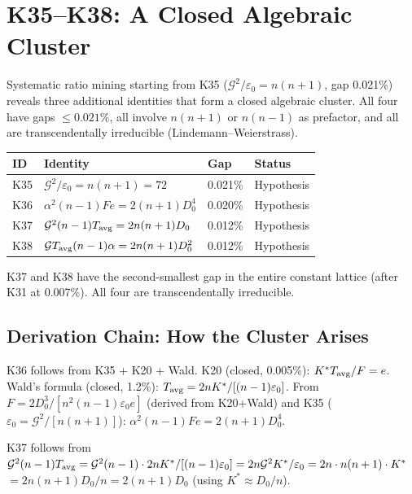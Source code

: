 \documentclass[12pt, a4paper]{article}
\begin{document}
\section{K35--K38: A Closed Algebraic Cluster}

Systematic ratio mining starting from K35 ($\mathcal{G}^2/\varepsilon_0 = n(n+1)$,
gap 0.021\%) reveals three additional identities that form a closed algebraic cluster.
All four have gaps $\leq 0.021\%$, all involve $n(n+1)$ or $n(n-1)$ as prefactor,
and all are transcendentally irreducible (Lindemann--Weierstrass).

\begin{keybox}[title={K35--K38: The Closed Cluster}]
\begin{center}
\renewcommand{\arraystretch}{1.3}
\begin{tabular}{p{0.7cm} p{6.5cm} p{1.5cm} p{2cm}}
\toprule
\textbf{ID} & \textbf{Identity} & \textbf{Gap} & \textbf{Status} \\
\midrule
K35 & $\mathcal{G}^2/\varepsilon_0 = n(n+1) = 72$ & 0.021\% & Hypothesis \\
K36 & $\alpha^2(n-1)Fe = 2(n+1)D_0^4$ & 0.020\% & Hypothesis \\
K37 & $\mathcal{G}^2(n-1)T_{\rm avg} = 2n(n+1)D_0$ & 0.012\% & Hypothesis \\
K38 & $\mathcal{G}T_{\rm avg}(n-1)\alpha = 2n(n+1)D_0^2$ & 0.012\% & Hypothesis \\
\bottomrule
\end{tabular}
\end{center}
K37 and K38 have the second-smallest gap in the entire constant lattice (after K31 at 0.007\%).
All four are transcendentally irreducible.
\end{keybox}

\subsection{Derivation Chain: How the Cluster Arises}

K36 follows from K35 + K20 + Wald. K20 (closed, 0.005\%): $K^*T_{\rm avg}/F = e$.
Wald's formula (closed, 1.2\%): $T_{\rm avg} = 2nK^*/[(n-1)\varepsilon_0]$.
From $F = 2D_0^3/[n^2(n-1)\varepsilon_0 e]$ (derived from K20+Wald) and K35
($\varepsilon_0 = \mathcal{G}^2/[n(n+1)]$):
$\alpha^2(n-1)Fe = 2(n+1)D_0^4$.

K37 follows from $\mathcal{G}^2(n-1)T_{\rm avg} = \mathcal{G}^2(n-1)\cdot 2nK^*/[(n-1)\varepsilon_0]
= 2n\mathcal{G}^2K^*/\varepsilon_0 = 2n\cdot n(n+1)\cdot K^*$
$= 2n(n+1)D_0/n = 2(n+1)D_0$ (using $K^*\approx D_0/n$).
\end{document}
